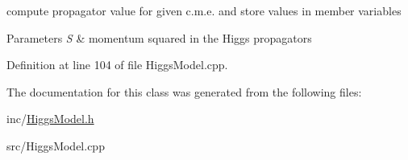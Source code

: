 compute propagator value for given c.\-m.\-e. and store values in member variables 


\begin{DoxyParams}{Parameters}
{\em S} & momentum squared in the Higgs propagators \\
\hline
\end{DoxyParams}


Definition at line 104 of file Higgs\-Model.\-cpp.



The documentation for this class was generated from the following files\-:\begin{DoxyCompactItemize}
\item 
inc/\hyperlink{HiggsModel_8h}{Higgs\-Model.\-h}\item 
src/Higgs\-Model.\-cpp\end{DoxyCompactItemize}
